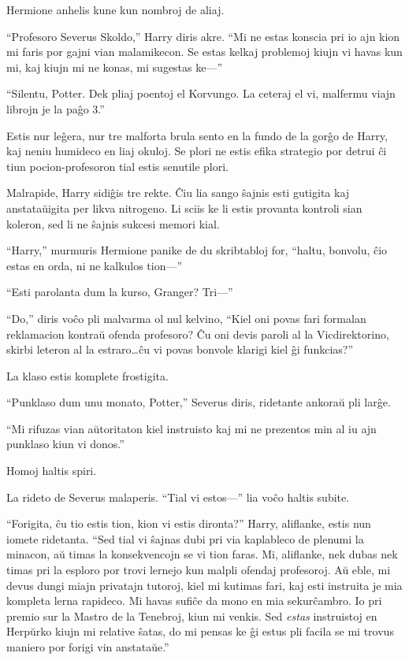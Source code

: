 Hermione anhelis kune kun nombroj de aliaj.

``Profesoro Severus Skoldo,'' Harry diris akre. ``Mi ne estas konscia
pri io ajn kion mi faris por gajni vian malamikecon. Se estas kelkaj
problemoj kiujn vi havas kun mi, kaj kiujn mi ne konas, mi sugestas
ke—''

``Silentu, Potter. Dek pliaj poentoj el Korvungo. La ceteraj el vi,
malfermu viajn librojn je la paĝo 3.''


Estis nur leĝera, nur tre malforta brula sento en la fundo de la gorĝo
de Harry, kaj neniu humideco en liaj okuloj. Se plori ne estis efika
strategio por detrui ĉi tiun pocion-profesoron tial estis senutile
plori.

Malrapide, Harry sidiĝis tre rekte. Ĉiu lia sango ŝajnis esti gutigita
kaj anstataŭigita per likva nitrogeno. Li sciis ke li estis provanta
kontroli sian koleron, sed li ne ŝajnis sukcesi memori kial.

``Harry,'' murmuris Hermione panike de du skribtabloj for, ``haltu,
bonvolu, ĉio estas en orda, ni ne kalkulos tion—''

``Esti parolanta dum la kurso, Granger? Tri—''

``Do,'' diris voĉo pli malvarma ol nul kelvino, ``Kiel oni povas fari
formalan reklamacion kontraŭ ofenda profesoro? Ĉu oni devis paroli al
la Vicdirektorino, skirbi leteron al la estraro\ldots ĉu vi povas
bonvole klarigi kiel ĝi funkcias?''

La klaso estis komplete frostigita.

``Punklaso dum unu monato, Potter,'' Severus diris, ridetante ankoraŭ
pli larĝe.

``Mi rifuzas vian aŭtoritaton kiel instruisto kaj mi ne prezentos min
al iu ajn punklaso kiun vi donos.''

Homoj haltis spiri.

La rideto de Severus malaperis. ``Tial vi estos—'' lia voĉo haltis subite.

``Forigita, ĉu tio estis tion, kion vi estis dironta?'' Harry,
aliflanke, estis nun iomete ridetanta. ``Sed tial vi ŝajnas dubi pri
via kaplableco de plenumi la minacon, aŭ timas la konsekvencojn se vi
tion faras. Mi, aliflanke, nek dubas nek timas pri la esploro por
trovi lernejo kun malpli ofendaj profesoroj. Aŭ eble, mi devus dungi
miajn privatajn tutoroj, kiel mi kutimas fari, kaj esti instruita je
mia kompleta lerna rapideco. Mi havas sufiĉe da mono en mia
sekurĉambro. Io pri premio sur la Mastro de la Tenebroj, kiun mi
venkis. Sed \emph{estas} instruistoj en Herpŭrko kiujn mi relative
ŝatas, do mi pensas ke ĝi estus pli facila se mi trovus maniero por
forigi vin anstataŭe.''


